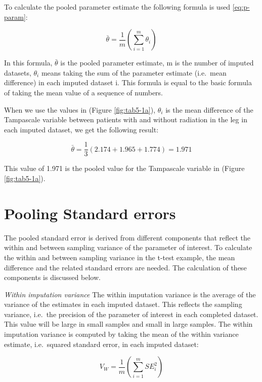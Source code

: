 \documentclass[]{book}
\theoremstyle{definition}
\theoremstyle{definition}
\theoremstyle{definition}
\theoremstyle{remark}
\begin{document}
To calculate the pooled parameter estimate the following formula is used
\eqref{eq:p-param}:

\begin{equation}
  \bar{\theta} = \frac{1}{m}\left (\sum_{i=1}^m{\theta_i}\right )
  \label{eq:p-param}
\end{equation}

In this formula, \(\bar{\theta}\) is the pooled parameter estimate, m is
the number of imputed datasets, \(\theta_i\) means taking the sum of the
parameter estimate (i.e.~mean difference) in each imputed dataset i.
This formula is equal to the basic formula of taking the mean value of a
sequence of numbers.

When we use the values in (Figure \ref{fig:tab5-1a}), \(\theta_i\) is
the mean difference of the Tampascale variable between patients with and
without radiation in the leg in each imputed dataset, we get the
following result:

\[\bar{\theta} = \frac{1}{3}(2.174 + 1.965+1.774)=1.971\]

This value of 1.971 is the pooled value for the Tampascale variable in
(Figure \ref{fig:tab5-1a}).

\section{Pooling Standard errors}\label{pooling-standard-errors}

The pooled standard error is derived from different components that
reflect the within and between sampling variance of the parameter of
interest. To calculate the within and between sampling variance in the
t-test example, the mean difference and the related standard errors are
needed. The calculation of these components is discussed below.

\emph{Within imputation variance} The within imputation variance is the
average of the variance of the estimates in each imputed dataset. This
reflects the sampling variance, i.e.~the precision of the parameter of
interest in each completed dataset. This value will be large in small
samples and small in large samples. The within imputation variance is
computed by taking the mean of the within variance estimate,
i.e.~squared standard error, in each imputed dataset:

\begin{equation}
V_W = \frac{1}{m}\left (\sum_{i=1}^m{SE_i^2}\right )
  \label{eq:var-w}
\end{equation}
\end{document}
